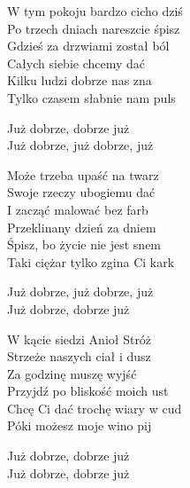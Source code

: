 \begin{text}
    W tym pokoju bardzo cicho dziś\\
    Po trzech dniach nareszcie śpisz\\
    Gdzieś za drzwiami został ból\\
    Całych siebie chcemy dać\\
    Kilku ludzi dobrze nas zna\\
    Tylko czasem słabnie nam puls

    Już dobrze, dobrze już\\
    Już dobrze, już dobrze, już

    Może trzeba upaść na twarz\\ 
    Swoje rzeczy ubogiemu dać\\ 
    I zacząć malować bez farb\\ 
    Przeklinany dzień za dniem\\ 
    Śpisz, bo życie nie jest snem\\ 
    Taki ciężar tylko zgina Ci kark

    Już dobrze, już dobrze, już\\ 
    Już dobrze, dobrze już

    W kącie siedzi Anioł Stróż\\ 
    Strzeże naszych ciał i dusz\\ 
    Za godzinę muszę wyjść\\ 
    Przyjdź po bliskość moich ust\\ 
    Chcę Ci dać trochę wiary w cud\\ 
    Póki możesz moje wino pij

    Już dobrze, dobrze już\\ 
    Już dobrze, dobrze już
\end{text}
\begin{chord}

\end{chord}